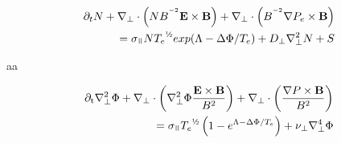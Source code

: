 \begin{refsection}
	\begin{equation}\begin{split}
		\partial_t N + \nabla_\perp\cdot\left(NB^{^{-2}}\mathbf{E}\times\mathbf{B}\right)
		+ \nabla_\perp\cdot\left(B^{^{-2}}\nabla P_e\times\mathbf{B}\right)
		  \\= \sigma_\para N{T_e}^{\text{\textonehalf}} exp({\Lambda-\Delta\Phi/T_e}) 
		 + D_\perp\nabla^2_\perp N + S
		 \end{split}
	\end{equation}
	
	aa
	
	\begin{equation}\begin{split}
			\partial_\text{t}\nabla_\perp^2 \Phi +\nabla_\perp\cdot\left(\nabla_\perp^2 \Phi\frac{\mathbf{E}\times\mathbf{B}}{B^2}\right)
			+ \nabla_\perp\cdot\left(\frac{\nabla P\times\mathbf{B}}{B^2}\right)
			\\= 
		\sigma_\para {T_e}^{\text{\textonehalf}}\left(1-e^{\Lambda-\Delta\Phi/T_e}\right) +\nu_\perp\nabla_\perp^4\Phi
	\end{split}\end{equation}
	

\end{refsection}
